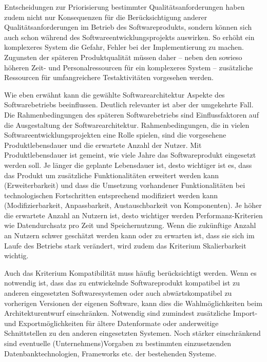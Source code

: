 \vspace{2mm} %

Entscheidungen zur Priorisierung bestimmter Qualitätsanforderungen haben zudem nicht nur Konsequenzen für die Berücksichtigung anderer Qualitätsanforderungen im Betrieb des Softwareprodukts, sondern können sich auch schon während des Software\-entwicklungs\-projekts auswirken. So erhöht ein komplexeres System die Gefahr, Fehler bei der Implementierung zu machen. Zugunsten der späteren Produktqualität müssen daher – neben den sowieso höheren Zeit- und Personalressourcen für ein komplexeres System – zusätzliche Ressourcen für umfangreichere Testaktivitäten vorgesehen werden.

\vspace{1.4mm} %


Wie  eben erwähnt kann die gewählte Softwarearchitektur Aspekte des Software\-betriebs beeinflussen. Deutlich relevanter ist aber der umgekehrte Fall. Die Rahmenbedingungen des späteren Softwarebetriebs sind Einflussfaktoren auf die Ausgestaltung der Softwarearchitektur. Rahmenbedingungen, die in vielen Software\-entwicklungs\-projekten eine Rolle spielen, sind die vorgesehene Produktlebensdauer und die erwartete Anzahl der Nutzer. Mit Produktlebensdauer ist gemeint, wie viele Jahre das Softwareprodukt eingesetzt werden soll. Je länger die geplante Lebensdauer ist, desto wichtiger ist es, dass das Produkt um zusätzliche Funktionalitäten erweitert werden kann (Erweiterbarkeit) und dass die Umsetzung vorhandener Funktionalitäten bei technologischen Fortschritten entsprechend modifiziert werden kann (Modifizierbarkeit, Anpassbarkeit, Austauschbarkeit von Komponenten). Je höher die erwartete Anzahl an Nutzern ist, desto wichtiger werden Performanz-Kriterien wie Datendurchsatz pro Zeit und Speichernutzung. Wenn die zukünftige Anzahl an Nutzern schwer geschätzt werden kann oder zu erwarten ist, dass sie sich im Laufe des Betriebs stark verändert, wird zudem das Kriterium Skalierbarkeit wichtig.

\vspace{1mm} %

Auch das Kriterium Kompatibilität muss häufig berücksichtigt werden. Wenn es notwendig ist, dass das zu entwickelnde Softwareprodukt kompatibel ist zu anderen eingesetzten Softwaresystemen oder auch abwärtskompatibel zu vorherigen Versionen der eigenen Software, kann dies die Wahlmöglichkeiten beim Architekturentwurf einschränken. Notwendig sind zumindest zusätzliche Import- und Exportmöglichkeiten für ältere Datenformate oder anderweitige Schnittstellen zu den anderen eingesetzten Systemen. Noch stärker einschränkend sind eventuelle (Unternehmens)Vorgaben zu bestimmten einzusetzenden Datenbanktechnologien, Frame\-works etc. der bestehenden Systeme.

